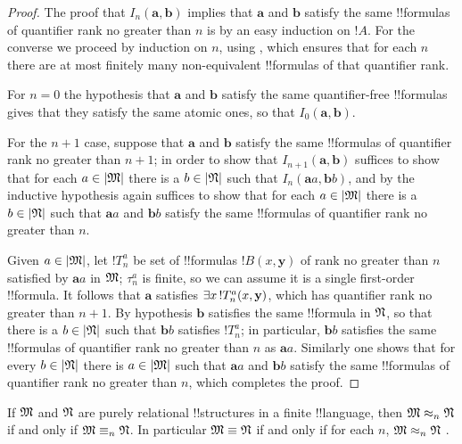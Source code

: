 \documentclass[../../../include/open-logic-section]{subfiles}
\begin{document}
\begin{proof}
  The proof that $I_n(\mathbf{a},\mathbf{b})$ implies that
  $\mathbf{a}$ and $\mathbf{b}$ satisfy the same !!{formula}s of
  quantifier rank no greater than $n$ is by an easy induction on
  $!A$. For the converse we proceed by induction on $n$, using
  , which ensures that for each $n$
  there are at most finitely many non-equivalent !!{formula}s of that
  quantifier rank.

  For $n=0$ the hypothesis that $\mathbf{a}$ and $\mathbf{b}$ satisfy
  the same quantifier-free !!{formula}s gives that they satisfy the same
  atomic ones, so that $I_0(\mathbf{a},\mathbf{b})$.

  For the $n+1$ case, suppose that $\mathbf{a}$ and $\mathbf{b}$
  satisfy the same !!{formula}s of quantifier rank no greater than
  $n+1$; in order to show that $I_{n+1}(\mathbf{a},\mathbf{b})$
  suffices to show that for each $a \in \Domain M$ there is a $b \in
  \Domain N$ such that $I_n(\mathbf{a}a,\mathbf{b}b)$, and by the
  inductive hypothesis again suffices to show that for each $a \in
  \Domain M$ there is a $b \in \Domain N$ such that $\mathbf{a}a$ and
  $\mathbf{b}b$ satisfy the same !!{formula}s of quantifier rank no
  greater than $n$.

  Given $a \in \Domain M$, let $!T^a_n$ be set of !!{formula}s
  $!B(x,\mathbf{y})$ of rank no greater than $n$ satisfied by
  $\mathbf{a}a$ in $\Struct{M}$; $\tau^a_n$ is finite, so we can
  assume it is a single first-order !!{formula}. It follows that
  $\mathbf{a}$ satisfies $\lexists[x][!T^a_n(x,\mathbf{y})]$, which
  has quantifier rank no greater than $n+1$. By hypothesis
  $\mathbf{b}$ satisfies the same !!{formula} in $\Struct{N}$, so that
  there is a $b \in \Domain N$ such that $\mathbf{b}b$ satisfies
  $!T^a_n$; in particular, $\mathbf{b}b$ satisfies the same
  !!{formula}s of quantifier rank no greater than $n$ as
  $\mathbf{a}a$. Similarly one shows that for every $b \in \Domain N$
  there is $a\in \Domain M$ such that $\mathbf{a}a$ and $\mathbf{b}b$
  satisfy the same !!{formula}s of quantifier rank no greater than $n$,
  which completes the proof.
\end{proof}

\begin{cor}
  If $\Struct{M}$ and $\Struct{N}$ are purely relational !!{structure}s
  in a finite !!{language}, then $\Struct{M} \approx_n\Struct{N}$ if and
  only if $\Struct{M} \elemequiv[n] \Struct{N}$. In particular
  $\Struct{M} \elemequiv \Struct{N}$ if and only if for each $n$,
  $\Struct{M} \approx_n \Struct{N}$ .
\end{cor}
\end{document}
